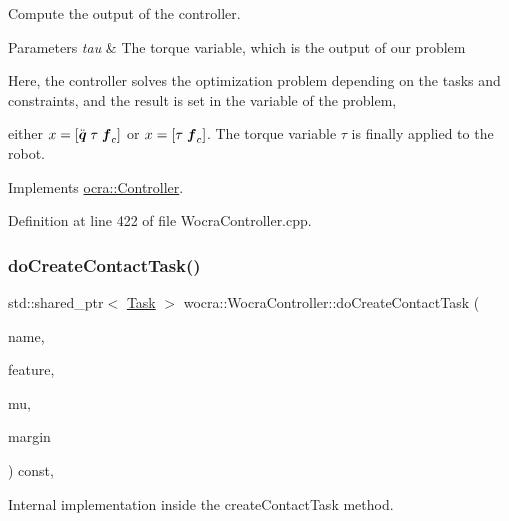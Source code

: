 Compute the output of the controller.


\begin{DoxyParams}{Parameters}
{\em tau} & The torque variable, which is the output of our problem\\
\hline
\end{DoxyParams}
Here, the controller solves the optimization problem depending on the tasks and constraints, and the result is set in the variable of the problem,

either $ x = [ \ddot{\mbox{\boldmath${q}$}} \; \tau \; \mbox{\boldmath${f}$}_c ] $ or $ x = [ \tau \; \mbox{\boldmath${f}$}_c ] $. The torque variable $ \tau $ is finally applied to the robot. 

Implements \hyperlink{classocra_1_1Controller_a8ca85413067d948459afa5981b3dda32}{ocra\+::\+Controller}.



Definition at line 422 of file Wocra\+Controller.\+cpp.

\hypertarget{classwocra_1_1WocraController_a60caf0250523856f915785efde7d2368}{}\label{classwocra_1_1WocraController_a60caf0250523856f915785efde7d2368} 
\subsubsection{\texorpdfstring{do\+Create\+Contact\+Task()}{doCreateContactTask()}}
{\footnotesize\ttfamily std\+::shared\+\_\+ptr$<$ \hyperlink{classocra_1_1Task}{Task} $>$ wocra\+::\+Wocra\+Controller\+::do\+Create\+Contact\+Task (\begin{DoxyParamCaption}\item[{const std\+::string \&}]{name,  }\item[{Point\+Contact\+Feature\+::\+Ptr}]{feature,  }\item[{double}]{mu,  }\item[{double}]{margin }\end{DoxyParamCaption}) const\hspace{0.3cm}{\ttfamily [protected]}, {\ttfamily [virtual]}}

Internal implementation inside the create\+Contact\+Task method.


